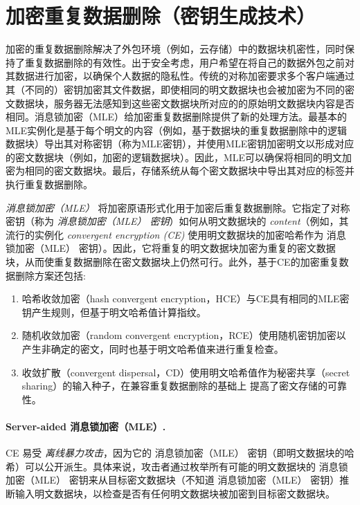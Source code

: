\section{加密重复数据删除（密钥生成技术）}
\label{sec:background-encrypted-deduplication}

加密的重复数据删除解决了外包环境（例如，云存储）中的数据块机密性，同时保持了重复数据删除的有效性。出于安全考虑，用户希望在将自己的数据外包之前对其数据进行加密，以确保个人数据的隐私性。传统的对称加密要求多个客户端通过其（不同的）密钥加密其文件数据，即使相同的明文数据块也会被加密为不同的密文数据块，服务器无法感知到这些密文数据块所对应的的原始明文数据块内容是否相同。消息锁加密（MLE）\cite{bellare2013message}给加密重复数据删除提供了新的处理方法。最基本的MLE实例化是基于每个明文的内容（例如，基于数据块的重复数据删除中的逻辑数据块）导出其对称密钥（称为MLE密钥），并使用MLE密钥加密明文以形成对应的密文数据块（例如，加密的逻辑数据块）。因此，MLE可以确保将相同的明文加密为相同的密文数据块。最后，存储系统从每个密文数据块中导出其对应的标签并执行重复数据删除。

\textit{消息锁加密（MLE）} \cite{bellare2013MLE} 将加密原语形式化用于加密后重复数据删除。它指定了对称密钥（称为 \textit{ 消息锁加密（MLE） 密钥}）如何从明文数据块的 \textit{ content}（例如，其流行的实例化 \textit{ convergent encryption (CE)} \cite{douceur02}使用明文数据块的加密哈希作为 消息锁加密（MLE） 密钥）。因此，它将重复的明文数据块加密为重复的密文数据块，从而使重复数据删除在密文数据块上仍然可行。此外，基于CE的加密重复数据删除方案还包括:

\begin{enumerate}
    \item 哈希收敛加密（hash convergent encryption，HCE）\cite{douceur2002reclaiming}与CE具有相同的MLE密钥产生规则，但基于明文哈希值计算指纹。
    \item 随机收敛加密（random convergent encryption，RCE）\cite{douceur2002reclaiming}使用随机密钥加密以产生非确定的密文，同时也基于明文哈希值来进行重复检查。
    \item 收敛扩散（convergent dispersal，CD）\cite{li2016cdstore}使用明文哈希值作为秘密共享（secret sharing）的输入种子，在兼容重复数据删除的基础上 提高了密文存储的可靠性。
\end{enumerate}


\paragraph*{Server-aided 消息锁加密（MLE）.} CE 易受 \textit{ 离线暴力攻击}，因为它的 消息锁加密（MLE） 密钥（即明文数据块的哈希）可以公开派生。具体来说，攻击者通过枚举所有可能的明文数据块的 消息锁加密（MLE） 密钥来从目标密文数据块（不知道 消息锁加密（MLE） 密钥）推断输入明文数据块，以检查是否有任何明文数据块被加密到目标密文数据块。

